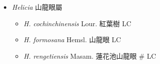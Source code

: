 
  \begin{itemize}
 \item[] \textit{Helicia} 山龍眼屬
                                
  \begin{itemize}
        \item[] \textit{H. cochinchinensis} Lour.  紅葉樹   LC
        \item[] \textit{H. formosana} Hemsl.  山龍眼   LC
        \item[] \textit{H. rengetiensis} Masam.  蓮花池山龍眼  \# LC
  \end{itemize}
  \end{itemize}
